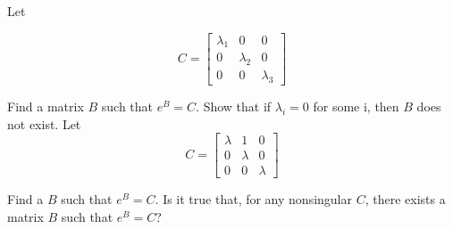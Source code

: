 \item[3.24] Let

\begin{equation*}
C = \begin{bmatrix}
 \lambda_1 & 0 & 0\\
 0 &  \lambda_2 & 0\\
 0 & 0 & \lambda_3
\end{bmatrix}
\end{equation*}

Find a matrix $B$ such that $e^B = C$.
Show that if $\lambda_i = 0$ for some i, then $B$ does not exist.
Let
\begin{equation*}
 C = \begin{bmatrix}
      \lambda & 1 & 0\\
      0 & \lambda & 0\\
      0 & 0 & \lambda
     \end{bmatrix}
\end{equation*}

Find a $B$ such that $e^B = C$.
Is it true that, for any nonsingular $C$, there exists a matrix $B$ such that $e^B = C$?
